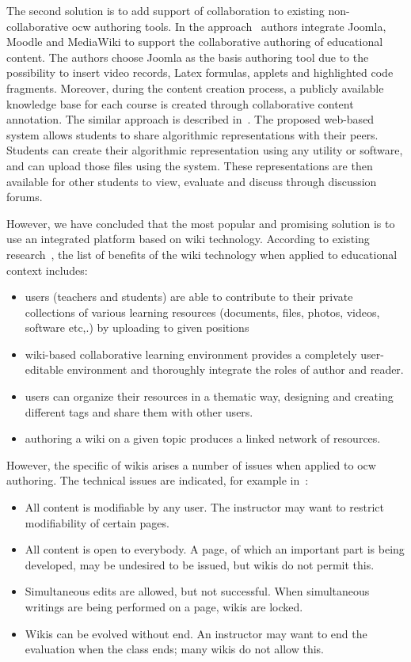 \documentclass[PhD, Submit, ngerman,UKenglish,table]{scrbook}
\begin{document}
The second solution is to add support of collaboration to existing non-collaborative \gls{ocw} authoring tools.
In the approach~\cite{Greenhow2009} authors integrate Joomla, Moodle and MediaWiki to support the collaborative authoring of educational content.
The authors choose Joomla as the basis authoring tool due to the possibility to insert video records, Latex formulas, applets and highlighted code fragments.
Moreover, during the content creation process, a publicly available knowledge base for each course is created through collaborative content annotation.
The similar approach is described in~\cite{hubscher2003constructive}.
The proposed web-based system allows students to share algorithmic representations with their peers.
Students can create their algorithmic representation using any utility or software, and can upload those files using the system.
These representations are then available for other students to view, evaluate and discuss through discussion forums.

However, we have concluded that the most popular and promising solution is to use an integrated platform based on wiki technology. 
According to existing research~\cite{Jiake2010, Gokcearslan2011}, the list of benefits of the wiki technology when applied to educational context includes:
\begin{itemize}
\item users (teachers and students) are able to contribute to their private collections of various learning resources (documents, files, photos, videos, software etc,.) by uploading to given positions
\item wiki-based collaborative learning environment provides a completely user-editable environment and thoroughly integrate the roles of author and reader.  
\item users can organize their resources in a thematic way, designing and creating different tags and share them with other users.
\item authoring a wiki on a given topic produces a linked network of resources.
\end{itemize}


However, the specific of wikis arises a number of issues when applied to \gls{ocw} authoring. 
The technical issues are indicated, for example in~\cite{wang2004extending, elrufaie2005wiki}:
\begin{itemize}
\item All content is modifiable by any user. The instructor may want to restrict modifiability of certain pages.
\item All content is open to everybody. A page, of which an important part is being developed, may be undesired to be issued, but wikis do not permit this.
\item Simultaneous edits are allowed, but not successful. When simultaneous writings are being performed on a page, wikis are locked.
\item Wikis can be evolved without end. An instructor may want to end the evaluation when the class ends; many wikis do not allow this.
\end{itemize}
\end{document}
